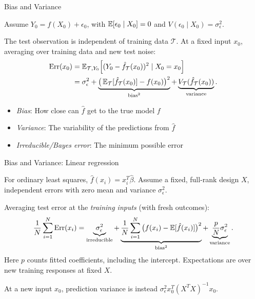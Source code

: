 \documentclass[10pt]{beamer}
\begin{document}
\begin{frame}{Bias and Variance}

Assume $Y_0=f(X_0)+\epsilon_0$, with
$\operatorname{\mathbb{E}}[\epsilon_0\mid X_0]=0$ and $V(\epsilon_0\mid X_0)=\sigma_\epsilon^2$.

The test observation is independent of training data $\mathcal T$.
At a fixed input $x_0$, averaging over training data and new test noise:
\begin{align*}
\text{Err}(x_0)
 &= \operatorname{\mathbb{E}}_{\mathcal T,Y_0}\!\left[(Y_0-\hat f_{\mathcal T}(x_0))^2\mid X_0=x_0\right] \\
 &= \sigma_\epsilon^2
 +\underbrace{\big(\operatorname{\mathbb{E}}_{\mathcal T}[\hat f_{\mathcal T}(x_0)]-f(x_0)\big)^2}_{\text{bias}^2}
 +\underbrace{V_{\mathcal T}(\hat f_{\mathcal T}(x_0))}_{\text{variance}}.
\end{align*}
\pause
\begin{itemize}
\item \emph{Bias}: How close can $\hat{f}$ get to the true model $f$
\item \emph{Variance}: The variability of the predictions from $\hat{f}$
\item \emph{Irreducible/Bayes error}: The minimum possible error
\end{itemize}

\end{frame}


\begin{frame}{Bias and Variance: Linear regression}

For ordinary least squares, $\hat f(x_i)=x_i^T\hat\beta$.
Assume a fixed, full-rank design $X$, independent errors with zero mean and variance $\sigma_\epsilon^2$.

Averaging test error at the \emph{training inputs} (with fresh outcomes):
\[
\frac{1}{N}\sum_{i=1}^N\text{Err}(x_i)
=\underbrace{\sigma_\epsilon^2}_{\text{irreducible}}
+\underbrace{\frac{1}{N}\sum_{i=1}^N
\big(f(x_i)-\operatorname{\mathbb{E}}[\hat f(x_i)]\big)^2}_{\text{bias}^2}
+\underbrace{\frac{p}{N}\sigma_\epsilon^2}_{\text{variance}}.
\]
Here $p$ counts fitted coefficients, including the intercept. Expectations are over new training responses at fixed $X$.

At a new input $x_0$, prediction variance is instead
$\sigma_\epsilon^2 x_0^T(X^TX)^{-1}x_0$.

\end{frame}
\end{document}
